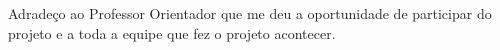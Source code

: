 \begin{agradecimentos}

Adradeço ao Professor Orientador que me deu a oportunidade de participar do projeto e a toda a equipe que fez o projeto acontecer.

\end{agradecimentos}
